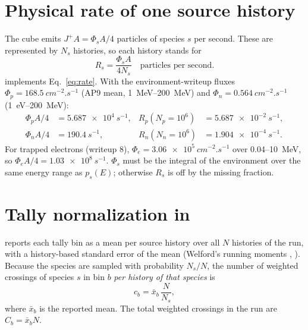 

\section{Physical rate of one source history}

The cube emits $J^+ A = \Phi_s A/4$ particles of species $s$ per second. These are represented by $N_s$ histories, so each history stands for
\begin{equation}
  R_s = \frac{\Phi_s A}{4 N_s}\quad\text{particles per second}.
  \label{eq:rate}
\end{equation}
 implements Eq.~\eqref{eq:rate}. With the environment-writeup fluxes $\Phi_p=\SI{168.5}{cm^{-2}.s^{-1}}$ (AP9 mean, \SIrange{1}{200}{MeV}) and $\Phi_n=\SI{0.564}{cm^{-2}.s^{-1}}$ (\SI{1}{eV}--\SI{200}{MeV}):
\begin{align*}
  \Phi_p A/4 &= \SI{5.687e4}{s^{-1}}, & R_p(N_p=10^6) &= \SI{5.687e-2}{s^{-1}},\\
  \Phi_n A/4 &= \SI{190.4}{s^{-1}},   & R_n(N_n=10^6) &= \SI{1.904e-4}{s^{-1}}.
\end{align*}
For trapped electrons (writeup 8), $\Phi_e=\SI{3.06e5}{cm^{-2}.s^{-1}}$ over 0.04--\SI{10}{MeV}, so $\Phi_eA/4=\SI{1.03e8}{s^{-1}}$. $\Phi_s$ must be the integral of the environment over the same energy range as $p_s(E)$; otherwise $R_s$ is off by the missing fraction.


\section{Tally normalization in \mcdc}

\mcdc{} \citep{morgan2024mcdc} reports each tally bin as a mean per source history over all $N$ histories of the run, with a history-based standard error of the mean (Welford's running moments \citep{welford1962}, ). Because the species are sampled with probability $N_s/N$, the number of weighted crossings of species $s$ in bin $b$ \emph{per history of that species} is
\begin{equation}
  c_b = \bar x_b\,\frac{N}{N_s},
\end{equation}
where $\bar x_b$ is the reported mean. The total weighted crossings in the run are $C_b = \bar x_b N$.

